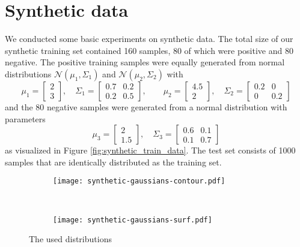 \section{Synthetic data}
We conducted some basic experiments on synthetic data. 
The total size of our synthetic training set contained 160 samples, 80 of which were positive and 80 negative. 
The positive training samples were equally generated from normal distributions $\mathcal{N}(\mu_1,\Sigma_1)$ and $\mathcal{N}(\mu_2, \Sigma_2)$ with 
$$\mu_1= \begin{bmatrix}2 \\ 3 \end{bmatrix}, \quad \Sigma_1 = \begin{bmatrix}0.7 & 0.2 \\ 0.2 & 0.5 \end{bmatrix}, \qquad \mu_2 = \begin{bmatrix}4.5 \\ 2 \end{bmatrix}, \quad \Sigma_2 = \begin{bmatrix} 0.2 & 0 \\ 0 & 0.2 \end{bmatrix}$$
and the 80 negative samples were generated from a normal distribution with parameters 
$$\mu_3 = \begin{bmatrix} 2\\1.5\end{bmatrix}, \quad \Sigma_3 = \begin{bmatrix}0.6 & 0.1\\ 0.1 & 0.7\end{bmatrix}$$
as visualized in Figure \ref{fig:synthetic_train_data}. The test set consists of 1000 samples that are identically distributed as the training set.
\begin{figure}[ht]
	\centering
	\begin{subfigure}[h]{0.45\textwidth}
	\texttt{[image: synthetic-gaussians-contour.pdf]}	
	\end{subfigure}
	~
	\begin{subfigure}[h]{0.45\textwidth}
	\texttt{[image: synthetic-gaussians-surf.pdf]}	
	\end{subfigure}
	\caption{The used distributions}
	\label{fig:synthetic-gaussians}
\end{figure}

